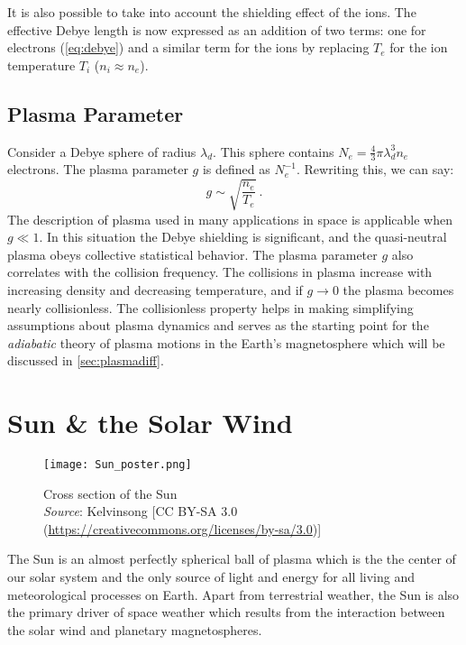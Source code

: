 It is also possible to take into account the shielding effect of the ions. The effective Debye 
length is now expressed as an addition of two terms: one for electrons (\cref{eq:debye}) and a 
similar term for the ions by replacing $T_e$ for the ion temperature $T_i$ ($n_i \approx n_e$). 

\subsection*{Plasma Parameter}

Consider a Debye sphere of radius $\lambda_d$. This sphere contains 
$N_e = \frac{4}{3}\pi \lambda^3_d n_e$ electrons. The plasma parameter $g$ is defined as 
$N_{e}^{-1}$. Rewriting this, we can say:
%
\[
    g \sim \sqrt{\frac{n_e}{T_e}} \ .
\]
%
The description of plasma used in many applications in space is applicable when $g \ll 1$. In 
this situation the Debye shielding is significant, and the quasi-neutral plasma obeys collective 
statistical behavior. The plasma parameter $g$ also correlates with the collision frequency. The 
collisions in plasma increase with increasing density and decreasing temperature, and if 
$g \longrightarrow 0$ the plasma becomes nearly collisionless. The collisionless property helps in 
making simplifying assumptions about plasma dynamics and serves as the starting point for the 
\emph{adiabatic} theory of plasma motions in the Earth's magnetosphere which will be discussed in 
\cref{sec:plasmadiff}.

\section{Sun \& the Solar Wind}\label{sec:solar}

\begin{figure}
    \noindent\centering\texttt{[image: Sun\_poster.png]}
    \caption{{\small Cross section of the Sun \\ 
    \textit{Source}: Kelvinsong [CC BY-SA 3.0 (\url{https://creativecommons.org/licenses/by-sa/3.0})]}}
    \label{fig:SunLayers}
\end{figure}

The Sun is an almost perfectly spherical ball of plasma which is the the center of our solar 
system and the only source of light and energy for all living and meteorological processes on 
Earth. Apart from terrestrial weather, the Sun is also the primary driver of space weather which 
results from the interaction between the solar wind and planetary magnetospheres.


